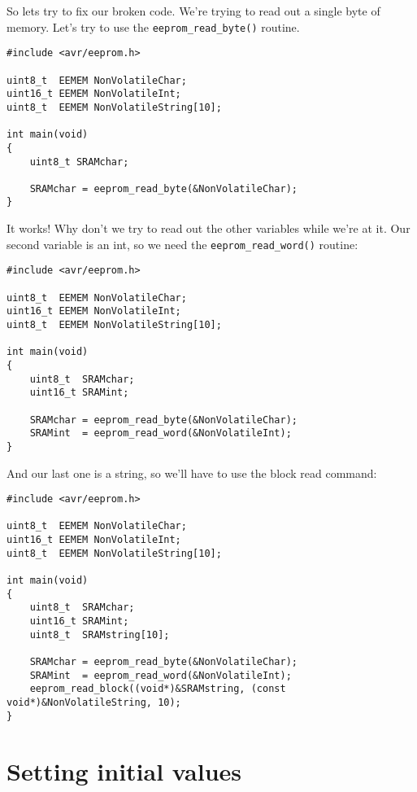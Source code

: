 \documentclass[a4paper,oneside,notitlepage]{book}
\begin{document}
So lets try to fix our broken code. We're trying to read out a single byte of memory. Let's try to use the \lstinline{eeprom_read_byte()} routine.

\begin{center}
\begin{lstlisting}
#include <avr/eeprom.h>

uint8_t  EEMEM NonVolatileChar;
uint16_t EEMEM NonVolatileInt;
uint8_t  EEMEM NonVolatileString[10];

int main(void)
{
    uint8_t SRAMchar;

    SRAMchar = eeprom_read_byte(&NonVolatileChar);
}
\end{lstlisting}
\end{center}

It works! Why don't we try to read out the other variables while we're at it. Our second variable is an int, so we need the \lstinline{eeprom_read_word()} routine:

\begin{center}
\begin{lstlisting}
#include <avr/eeprom.h>

uint8_t  EEMEM NonVolatileChar;
uint16_t EEMEM NonVolatileInt;
uint8_t  EEMEM NonVolatileString[10];

int main(void)
{
    uint8_t  SRAMchar;
    uint16_t SRAMint;

    SRAMchar = eeprom_read_byte(&NonVolatileChar);
    SRAMint  = eeprom_read_word(&NonVolatileInt);
}
\end{lstlisting}
\end{center}

And our last one is a string, so we'll have to use the block read command:

\begin{center}
\begin{lstlisting}
#include <avr/eeprom.h>

uint8_t  EEMEM NonVolatileChar;
uint16_t EEMEM NonVolatileInt;
uint8_t  EEMEM NonVolatileString[10];

int main(void)
{
    uint8_t  SRAMchar;
    uint16_t SRAMint;
    uint8_t  SRAMstring[10];   

    SRAMchar = eeprom_read_byte(&NonVolatileChar);
    SRAMint  = eeprom_read_word(&NonVolatileInt);
    eeprom_read_block((void*)&SRAMstring, (const void*)&NonVolatileString, 10);
}
\end{lstlisting}
\end{center}


\chapter{Setting initial values}
\end{document}
